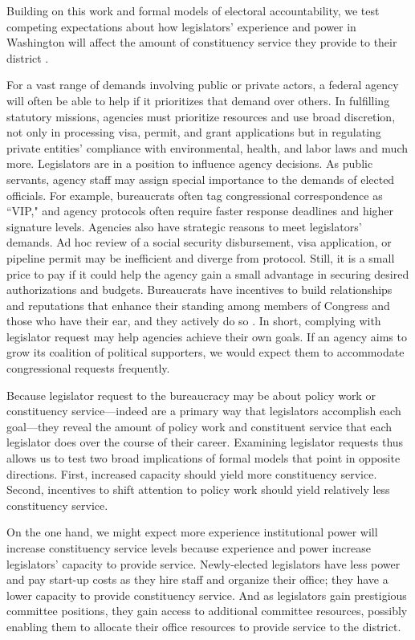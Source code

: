 \documentclass[12pt]{article}
\begin{document}
Building on this work and formal models of electoral accountability, we test competing expectations about how legislators' experience and power in Washington will affect the amount of constituency service they provide to their district \citep{AshworthBuenodeMesquita2006}. 

For a vast range of demands involving public or private actors, a federal agency will often be able to help if it prioritizes that demand over others. %
In fulfilling statutory missions, agencies must prioritize resources and use broad discretion, not only in processing visa, permit, and grant applications but in regulating private entities' compliance with environmental, health, and labor laws and much more. 
Legislators are in a position to influence agency decisions. As public servants, agency staff may assign special importance to the demands of elected officials. For example, bureaucrats often tag congressional correspondence as ``VIP," and agency protocols often require faster response deadlines and higher signature levels. %
Agencies also have strategic reasons to meet legislators' demands. Ad hoc review of a social security disbursement, visa application, or pipeline permit may be inefficient and diverge from protocol. Still, it is a small price to pay if it could help the agency gain a small advantage in securing desired authorizations and budgets. %
Bureaucrats have incentives to build relationships and reputations that enhance their standing among members of Congress and those who have their ear, and they actively do so \citep{Carpenter2001}. In short, complying with legislator request may help agencies achieve their own goals. If an agency aims to grow its coalition of political supporters, we would expect them to accommodate congressional requests frequently. 

Because legislator request to the bureaucracy may be about policy work or constituency service---indeed are a primary way that legislators accomplish each goal---they reveal the amount of policy work and constituent service that each legislator does over the course of their career. Examining legislator requests thus allows us to test two broad implications of formal models that point in opposite directions. First, increased capacity should yield more constituency service. Second, incentives to shift attention to policy work should yield relatively less constituency service.
 

On the one hand, we might expect more experience institutional power will increase constituency service levels because experience and power increase legislators' capacity to provide service. Newly-elected legislators have less power and pay start-up costs as they hire staff and organize their office; they have a lower capacity to provide constituency service. And as legislators gain prestigious committee positions, they gain access to additional committee resources, possibly enabling them to allocate their office resources to provide service to the district.
\end{document}
